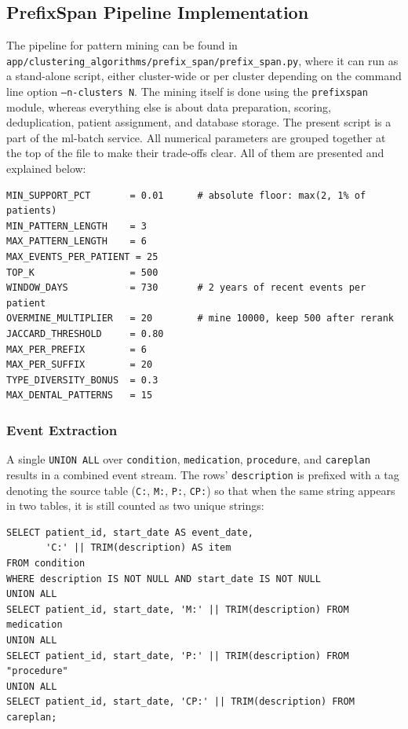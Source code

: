 \subsection{PrefixSpan Pipeline Implementation}

The pipeline for pattern mining can be found in \texttt{app/\allowbreak clustering\_\allowbreak algorithms/\allowbreak prefix\_\allowbreak span/\allowbreak prefix\_\allowbreak span.py}, where it can run as a stand-alone script, either cluster-wide or per cluster depending on the command line option \texttt{--n-clusters N}. The mining itself is done using the \texttt{prefixspan} module, whereas everything else is about data preparation, scoring, deduplication, patient assignment, and database storage. The present script is a part of the ml-batch service. All numerical parameters are grouped together at the top of the file to make their trade-offs clear. All of them are presented and explained below:

\begin{lstlisting}[style=pythonstyle]
MIN_SUPPORT_PCT       = 0.01      # absolute floor: max(2, 1% of patients)
MIN_PATTERN_LENGTH    = 3
MAX_PATTERN_LENGTH    = 6
MAX_EVENTS_PER_PATIENT = 25
TOP_K                 = 500
WINDOW_DAYS           = 730       # 2 years of recent events per patient
OVERMINE_MULTIPLIER   = 20        # mine 10000, keep 500 after rerank
JACCARD_THRESHOLD     = 0.80
MAX_PER_PREFIX        = 6
MAX_PER_SUFFIX        = 20
TYPE_DIVERSITY_BONUS  = 0.3
MAX_DENTAL_PATTERNS   = 15
\end{lstlisting}

\subsubsection*{Event Extraction}

A single \texttt{UNION ALL} over \texttt{condition}, \texttt{medication}, \texttt{procedure}, and \texttt{careplan} results in a combined event stream. The rows' \texttt{description} is prefixed with a tag denoting the source table (\texttt{C:}, \texttt{M:}, \texttt{P:}, \texttt{CP:}) so that when the same string appears in two tables, it is still counted as two unique strings:

\begin{lstlisting}[style=sqlstyle]
SELECT patient_id, start_date AS event_date,
       'C:' || TRIM(description) AS item
FROM condition
WHERE description IS NOT NULL AND start_date IS NOT NULL
UNION ALL
SELECT patient_id, start_date, 'M:' || TRIM(description) FROM medication
UNION ALL
SELECT patient_id, start_date, 'P:' || TRIM(description) FROM "procedure"
UNION ALL
SELECT patient_id, start_date, 'CP:' || TRIM(description) FROM careplan;
\end{lstlisting}

